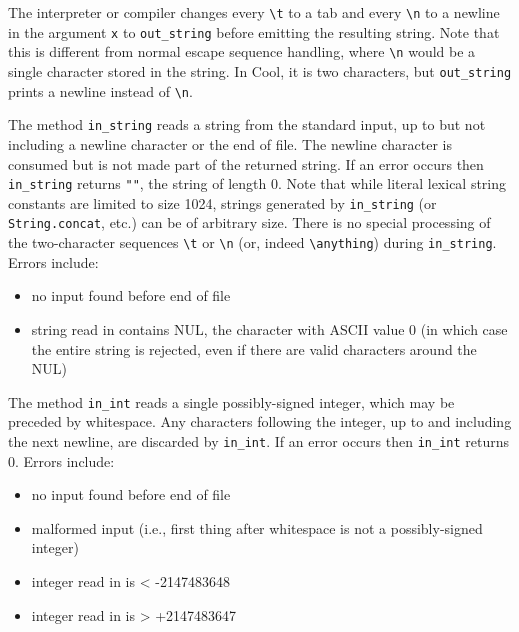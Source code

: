 \documentclass[]{article}
\begin{document}
The interpreter or compiler changes every \texttt{\textbackslash{}t} to
a tab and every \texttt{\textbackslash{}n} to a newline in the argument
\texttt{x} to \texttt{out\_string} before emitting the resulting string.
Note that this is different from normal escape sequence handling, where
\texttt{\textbackslash{}n} would be a single character stored in the
string. In Cool, it is two characters, but \texttt{out\_string} prints a
newline instead of \texttt{\textbackslash{}n}.

The method \texttt{in\_string} reads a string from the standard input,
up to but not including a newline character or the end of file. The
newline character is consumed but is not made part of the returned
string. If an error occurs then \texttt{in\_string} returns \texttt{""},
the string of length 0. Note that while literal lexical string constants
are limited to size 1024, strings generated by \texttt{in\_string} (or
\texttt{String.concat}, etc.) can be of arbitrary size. There is no
special processing of the two-character sequences
\texttt{\textbackslash{}t} or \texttt{\textbackslash{}n} (or, indeed
\texttt{\textbackslash{}anything}) during \texttt{in\_string}. Errors
include:

\begin{itemize}
\itemsep1pt\parskip0pt
\item
  no input found before end of file
\item
  string read in contains NUL, the character with ASCII value 0 (in
  which case the entire string is rejected, even if there are valid
  characters around the NUL)
\end{itemize}

The method \texttt{in\_int} reads a single possibly-signed integer,
which may be preceded by whitespace. Any characters following the
integer, up to and including the next newline, are discarded by
\texttt{in\_int}. If an error occurs then \texttt{in\_int} returns 0.
Errors include:

\begin{itemize}
\itemsep1pt\parskip0pt
\item
  no input found before end of file
\item
  malformed input (i.e., first thing after whitespace is not a
  possibly-signed integer)
\item
  integer read in is \textless{} -2147483648
\item
  integer read in is \textgreater{} +2147483647
\end{itemize}
\end{document}
